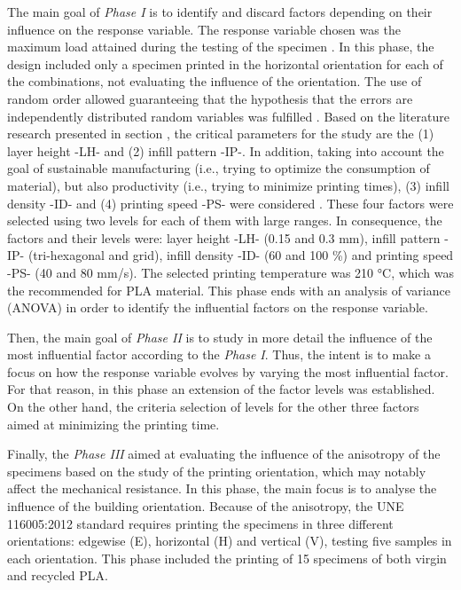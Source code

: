 \documentclass[]{interact}
\theoremstyle{plain}%
\theoremstyle{definition}
\theoremstyle{remark}
\begin{document}
The main goal of \emph{Phase I} is to identify and discard factors
depending on their influence on the response variable. The response
variable chosen was the maximum load attained during the testing of the
specimen \citep{Kumar2018b, Chacon2017, Letcher2015}. In this phase, the
design included only a specimen printed in the horizontal orientation
for each of the combinations, not evaluating the influence of the
orientation. The use of random order allowed guaranteeing that the
hypothesis that the errors are independently distributed random
variables was fulfilled \citep{Montgomery2001}. Based on the literature
research presented in section \label{section:background}, the critical
parameters for the study are the (1) layer height -LH- and (2) infill
pattern -IP-. In addition, taking into account the goal of sustainable
manufacturing (i.e., trying to optimize the consumption of material),
but also productivity (i.e., trying to minimize printing times), (3)
infill density -ID- and (4) printing speed -PS- were considered
\citep{Singh2019, Tanveer2019}. These four factors were selected using
two levels for each of them with large ranges. In consequence, the
factors and their levels were: layer height -LH- (0.15 and 0.3 mm),
infill pattern -IP- (tri-hexagonal and grid), infill density -ID- (60
and 100 \%) and printing speed -PS- (40 and 80 mm/s). The selected
printing temperature was 210 °C, which was the recommended for PLA
material. This phase ends with an analysis of variance (ANOVA) in order
to identify the influential factors on the response variable.

Then, the main goal of \emph{Phase II} is to study in more detail the
influence of the most influential factor according to the \emph{Phase
I}. Thus, the intent is to make a focus on how the response variable
evolves by varying the most influential factor. For that reason, in this
phase an extension of the factor levels was established. On the other
hand, the criteria selection of levels for the other three factors aimed
at minimizing the printing time.

Finally, the \emph{Phase III} aimed at evaluating the influence of the
anisotropy of the specimens based on the study of the printing
orientation, which may notably affect the mechanical resistance. In this
phase, the main focus is to analyse the influence of the building
orientation. Because of the anisotropy, the UNE 116005:2012 \citep{UNE}
standard requires printing the specimens in three different
orientations: edgewise (E), horizontal (H) and vertical (V), testing
five samples in each orientation. This phase included the printing of 15
specimens of both virgin and recycled PLA.
\end{document}
